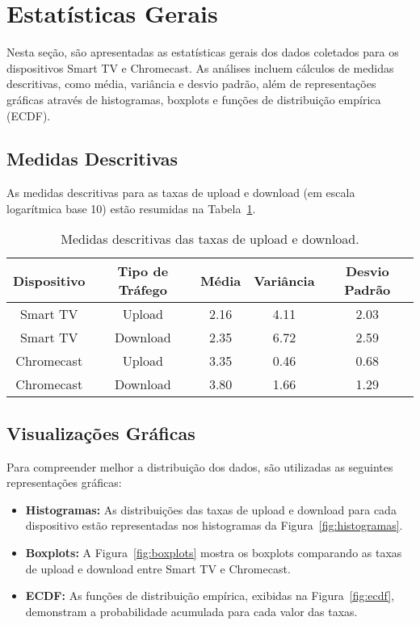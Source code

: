 \section{Estatísticas Gerais}

Nesta seção, são apresentadas as estatísticas gerais dos dados coletados para os dispositivos Smart TV e Chromecast. As análises incluem cálculos de medidas descritivas, como média, variância e desvio padrão, além de representações gráficas através de histogramas, boxplots e funções de distribuição empírica (ECDF). 

\subsection{Medidas Descritivas}

As medidas descritivas para as taxas de upload e download (em escala logarítmica base 10) estão resumidas na Tabela~\ref{tab:estatisticas}. 

\begin{table}[H]
\centering
\caption{Medidas descritivas das taxas de upload e download.}
\label{tab:estatisticas}
\begin{tabular}{|c|c|c|c|c|}
\hline
\textbf{Dispositivo} & \textbf{Tipo de Tráfego} & \textbf{Média} & \textbf{Variância} & \textbf{Desvio Padrão} \\ \hline
Smart TV & Upload & 2.16 & 4.11 & 2.03 \\ \hline
Smart TV & Download & 2.35 & 6.72 & 2.59 \\ \hline
Chromecast & Upload & 3.35 & 0.46 & 0.68 \\ \hline
Chromecast & Download & 3.80 & 1.66 & 1.29 \\ \hline
\end{tabular}
\end{table}

\subsection{Visualizações Gráficas}

Para compreender melhor a distribuição dos dados, são utilizadas as seguintes representações gráficas:

\begin{itemize}
    \item \textbf{Histogramas:} As distribuições das taxas de upload e download para cada dispositivo estão representadas nos histogramas da Figura~\ref{fig:histogramas}.
    \item \textbf{Boxplots:} A Figura~\ref{fig:boxplots} mostra os boxplots comparando as taxas de upload e download entre Smart TV e Chromecast.
    \item \textbf{ECDF:} As funções de distribuição empírica, exibidas na Figura~\ref{fig:ecdf}, demonstram a probabilidade acumulada para cada valor das taxas.
\end{itemize}


